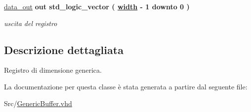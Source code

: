 \begin{DoxyCompactItemize}
\hyperlink{group___generic_buffer_ga0bf60a72cb11ffe1945b82ce0bb86a57}{data\+\_\+out}  {\bfseries {\bfseries \textcolor{vhdlchar}{out}\textcolor{vhdlchar}{ }}} {\bfseries \textcolor{vhdlchar}{std\+\_\+logic\+\_\+vector}\textcolor{vhdlchar}{ }\textcolor{vhdlchar}{(}\textcolor{vhdlchar}{ }\textcolor{vhdlchar}{ }\textcolor{vhdlchar}{ }\textcolor{vhdlchar}{ }{\bfseries \hyperlink{group___generic_buffer_gae47d961480346c1d82439a66505e6e7d}{width}} \textcolor{vhdlchar}{-\/}\textcolor{vhdlchar}{ } \textcolor{vhdldigit}{1} \textcolor{vhdlchar}{ }\textcolor{vhdlchar}{downto}\textcolor{vhdlchar}{ }\textcolor{vhdlchar}{ } \textcolor{vhdldigit}{0} \textcolor{vhdlchar}{ }\textcolor{vhdlchar}{)}\textcolor{vhdlchar}{ }} 
\begin{DoxyCompactList}\small\item\em uscita del registro \end{DoxyCompactList}\end{DoxyCompactItemize}


\subsection{Descrizione dettagliata}
Registro di dimensione generica. 

La documentazione per questa classe è stata generata a partire dal seguente file\+:\begin{DoxyCompactItemize}
\item 
Src/\hyperlink{_generic_buffer_8vhd}{Generic\+Buffer.\+vhd}\end{DoxyCompactItemize}
